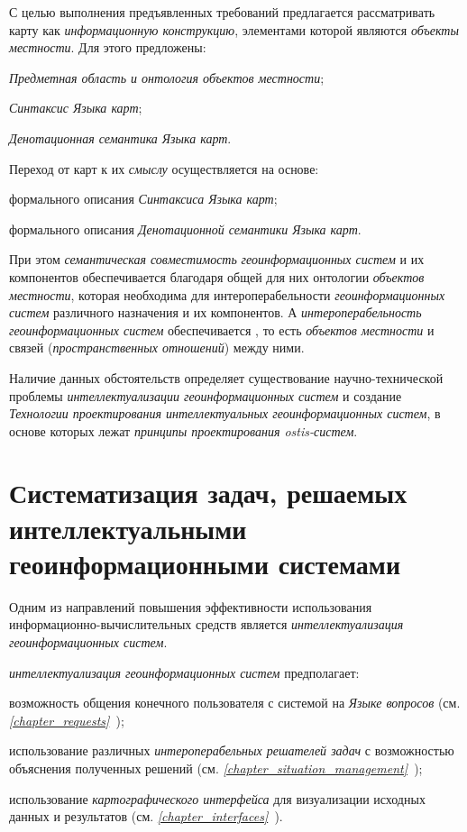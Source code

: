 С целью выполнения предъявленных требований предлагается рассматривать карту как \textit{информационную конструкцию}, элементами которой являются \textit{объекты местности}. Для этого предложены:
\begin{textitemize}
	\item \textit{Предметная область и онтология объектов местности};
	\item \textit{Синтаксис Языка карт}; 
	\item \textit{Денотационная семантика Языка карт}.
\end{textitemize}

Переход от карт к их \textit{смыслу} осуществляется на основе:
\begin{textitemize}
	\item формального описания \textit{Синтаксиса Языка карт};
	\item формального описания \textit{Денотационной семантики Языка карт}.
\end{textitemize}

При этом \textit{семантическая совместимость} \textit{геоинформационных систем} и их компонентов обеспечивается благодаря общей для них онтологии \textit{объектов местности}, которая необходима для интероперабельности \textit{геоинформационных систем} различного назначения и их компонентов. А \textit{интероперабельность геоинформационных систем} обеспечивается , то есть \textit{объектов местности} и связей (\textit{пространственных отношений}) между ними.

Наличие данных обстоятельств определяет существование научно-технической проблемы \textit{интеллектуализации геоинформационных систем} и создание \textit{Технологии проектирования интеллектуальных геоинформационных систем}, в основе которых лежат \textit{принципы проектирования ostis-систем}.

\section{Систематизация задач, решаемых интеллектуальными геоинформационными системами}
\label{chapter_gis_sec_tasks}

Одним из направлений повышения эффективности использования информационно-вычислительных средств является \textit{интеллектуализация геоинформационных систем}.

\textit{интеллектуализация геоинформационных систем} предполагает:
\begin{textitemize}
	\item возможность общения конечного пользователя с системой на \textit{Языке вопросов} (см. \textit{\ref{chapter_requests}~});
	\item использование различных \textit{интероперабельных решателей задач} с возможностью объяснения полученных решений (см. \textit{\ref{chapter_situation_management}~}); 
	\item использование \textit{картографического интерфейса} для визуализации исходных данных и результатов (см. \textit{\ref{chapter_interfaces}~}).
\end{textitemize}

